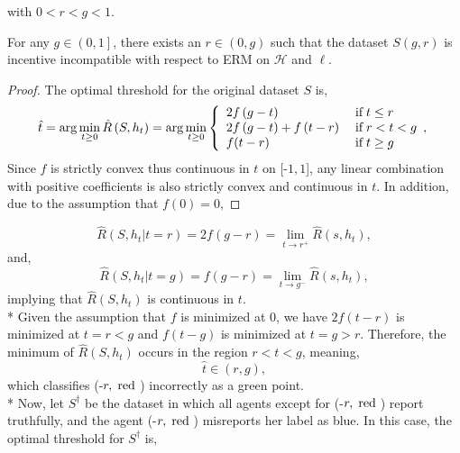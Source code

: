 \documentclass{article}
\begin{document}
with $0 < r < g < 1$.
\newline \newline
\begin{prop} \label{prop:ex1} 
For any $g  \in \left(0, 1\right]$, there exists an $r  \in \left(0, g\right)$ such that the dataset $S\left(g, r \right) $ is incentive incompatible with respect to ERM on $\mathcal{H}$ and $\ell$.
\end{prop}
\begin{proof} \label{proof:ex1pf} 
The optimal threshold for the original dataset $S $ is,
\begin{equation} \hat{t} = \arg\displaystyle\min_{t \geq  0} \hat{R}\left(S, h_{t}\right) = \arg\displaystyle\min_{t \geq  0}\left\{ \begin{array}{ll}
2 f\left(g - t\right)& \text{\;if\;} t \leq  r \\
2 f\left(g - t\right) + f\left(t - r\right)& \text{\;if\;} r < t < g \\
f(t - r)& \text{\;if\;} t \geq  g \\
\end{array},\right. \end{equation}
Since $f $ is strictly convex thus continuous in $t $ on [-$1, 1$], any linear combination with positive coefficients is also strictly convex and continuous in $t $. In addition, due to the assumption that $f\left(0\right)  = 0$,
\end{proof}
\begin{equation} 
\hat{R}\left(S, h_{t} | t = r\right) = 2 f\left(g - r\right) = \lim_{t \to  r^{+}} \hat{R}\left(s, h_{t}\right),
\end{equation}
and,
\begin{equation} 
\hat{R}\left(S, h_{t} | t = g\right) = f\left(g - r\right) = \lim_{t \to  g^{-}} \hat{R}\left(s, h_{t}\right),
\end{equation}
implying that $\hat{R}\left(S, h_{t}\right)$ is continuous in $t. $
\\* Given the assumption that $f $ is minimized at $0$, we have $2 f\left(t - r\right) $ is minimized at $t  = r < g$ and $f\left(t - g\right) $ is minimized at $t  = g > r$. Therefore, the minimum of $\hat{R}\left(S, h_{t}\right)$ occurs in the region $r  < t < g $, meaning,
\begin{equation} 
\hat{t} \in \left(r , g \right),
\end{equation}
which classifies (-$r , \text{\;red\;}$) incorrectly as a green point.
\\* Now, let $S^{\dagger}$ be the dataset in which all agents except for (-$r , \text{\;red\;}$) report truthfully, and the agent (-$r , \text{\;red\;}$) misreports her label as blue. In this case, the optimal threshold for $S^{\dagger}$ is,
\end{document}

